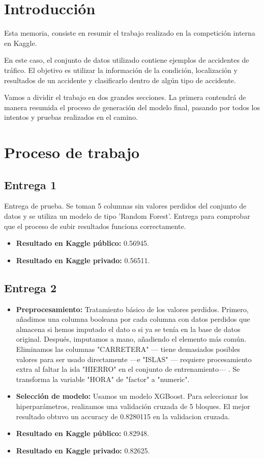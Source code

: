 \section{Introducción}
Esta memoria, consiste en resumir el trabajo realizado en la competición interna en Kaggle. 

En este caso, el conjunto de datos utilizado contiene ejemplos de accidentes de tráfico. El objetivo es utilizar la información de la condición, localización y resultados de un accidente y clasificarlo dentro de algún tipo de accidente.

Vamos a dividir el trabajo en dos grandes secciones. La primera contendrá de manera resumida el proceso de generación del modelo final, pasando por todos los intentos y pruebas realizados en el camino.
\section{Proceso de trabajo}

\subsection{Entrega 1}

Entrega de prueba. Se toman 5 columnas sin valores perdidos del conjunto de datos y se utiliza un modelo de tipo 'Random Forest'. Entrega para comprobar que el proceso de subir resultados funciona correctamente.
\begin{itemize}
\item \textbf{Resultado en Kaggle público:} 0.56945.
\item \textbf{Resultado en Kaggle privado:} 0.56511.
\end{itemize}

\subsection{Entrega 2}
\begin{itemize}
\item \textbf{Preprocesamiento:} Tratamiento básico de los valores perdidos. Primero, añadimos una columna booleana por cada columna con datos perdidos que almacena si hemos imputado el dato o si ya se tenía en la base de datos original. Después, imputamos a mano, añadiendo el elemento más común. Eliminamos las columnas "CARRETERA" --- tiene demasiados posibles valores para ser usado directamente ---e "ISLAS" --- requiere procesamiento extra al faltar la isla "HIERRO" en el conjunto de entrenamiento--- . Se transforma la variable "HORA" de "factor" a "numeric".
\item \textbf{Selección de modelo:} Usamos un modelo XGBoost. Para seleccionar los hiperparámetros, realizamos una validación cruzada de 5 bloques. El mejor resultado obtuvo un accuracy de 0.8280115 en la validacion cruzada.
\item \textbf{Resultado en Kaggle público:} 0.82948.
\item \textbf{Resultado en Kaggle privado:} 0.82625.
\end{itemize}

